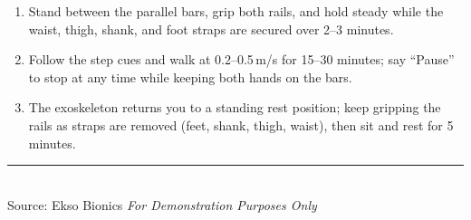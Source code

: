 \begin{enumerate}[leftmargin=1.5em,itemsep=2pt]
  \item Stand between the parallel bars, grip both rails, and hold steady while the waist, thigh, shank, and foot straps are secured over 2--3 minutes.
  \item Follow the step cues and walk at 0.2--0.5\,m/s for 15--30 minutes; say ``Pause'' to stop at any time while keeping both hands on the bars.
  \item The exoskeleton returns you to a standing rest position; keep gripping the rails as straps are removed (feet, shank, thigh, waist), then sit and rest for 5 minutes.
\end{enumerate}

\vfill
\noindent\rule{\textwidth}{0.4pt}\\
{\scriptsize Source: Ekso Bionics \hfill \textit{For Demonstration Purposes Only}}



